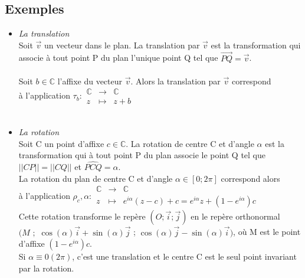 \documentclass[a4paper,10pt]{book}
\newcommand{\C}{\mathbb{C}}
\begin{document}
\subsection{Exemples} 
\begin{itemize}\renewcommand{\labelitemi}{$\bullet$}
\item \emph{La translation}\\

Soit $\vec{v}$ un vecteur dans le plan. La translation par $\vec{v}$ est la transformation qui associe à tout point P du plan l’unique point Q tel que $\overset{\longrightarrow}{PQ}=\vec{v}$.\\\\
Soit $b \in \C$ l’affixe du vecteur $\vec{v}$. Alors la translation par $\vec{v}$ correspond\\
à l’application $\tau_{b} : \begin{array}{rcl} \C &\longrightarrow &\C \\ z &\longmapsto &z + b \end{array}$\\\\

\item \emph{La rotation}\\

Soit C un point d’affixe $c \in \C$. La rotation de centre C et d’angle $\alpha$ est la transformation qui à tout point P du plan associe le point Q tel que $||CP||=||CQ||$ et $\widehat{PCQ}=\alpha$.\\

La rotation du plan de centre C et d’angle $\alpha \in [0;2\pi]$ correspond alors\\
à l’application $\rho_{c}, \alpha : \begin{array}{rcl} \C &\longrightarrow &\C \\ z &\longmapsto &e^{i\alpha} (z-c) + c = e^{i\alpha}z+(1-e^{i\alpha})c \end{array}$\\

Cette rotation transforme le repère $(O;\vec{i};\vec{j})$ en le repère orthonormal\\
$(M$ $;$ $\cos(\alpha)\vec{i}+\sin(\alpha)\vec{j}$ ; $\cos(\alpha)\vec{j}-\sin(\alpha)\vec{i})$, où M est le point d’affixe $(1-e^{i\alpha})c$.\\

Si $\alpha \equiv 0 (2\pi)$, c’est une translation et le centre C est le seul point invariant par la rotation.\\\\


\end{itemize}
\end{document}

